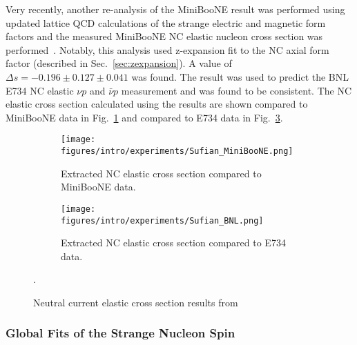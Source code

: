     Very recently, another re-analysis of the MiniBooNE result was performed
    using updated lattice QCD calculations of the strange electric and magnetic
    form factors and the measured MiniBooNE NC elastic nucleon cross section
    was performed~\cite{Sufian:2018qtw}. Notably, this analysis used
    z-expansion fit to the NC axial form factor (described in
    Sec.~\ref{sec:zexpansion}). A value of $\Delta s = -0.196\pm 0.127\pm
    0.041$ was found. The result was used to predict the BNL E734 NC elastic
    $\nu p$ and $\bar{\nu} p$ measurement and was found to be consistent. The
    NC elastic cross section calculated using the results are shown compared to
    MiniBooNE data in Fig.~\ref{fig:sufianuboone} and compared to E734 data in
    Fig.~\ref{fig:sufiane734}.
    \begin{figure}[h]
      \centering
      \begin{subfigure}[t]{2.5in}
        \texttt{[image: figures/intro/experiments/Sufian\_MiniBooNE.png]}
        \caption{Extracted NC elastic cross section compared to MiniBooNE data.}
        \label{fig:sufianuboone}
      \end{subfigure}
      \hspace{2pt}
      \begin{subfigure}[t]{2.5in}
        \texttt{[image: figures/intro/experiments/Sufian\_BNL.png]}
        \caption{Extracted NC elastic cross section compared to E734 data.}
        \label{fig:sufiane734}
      \end{subfigure}
      \caption{Neutral current elastic cross section results
      from~\cite{Sufian:2018qtw}}.
      \label{fig:sufiane734}
    \end{figure}

    \subsubsection{Global Fits of the Strange Nucleon Spin}


